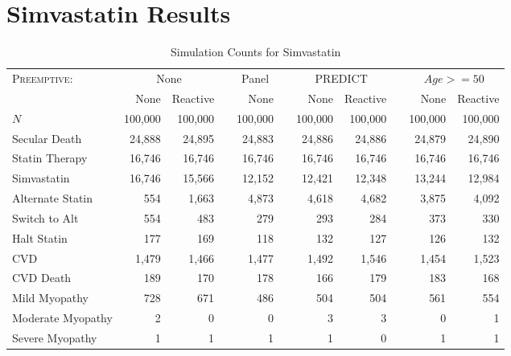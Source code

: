 \documentclass{article}
\begin{document}
\newcommand{\ra}[1]{\renewcommand{\arraystretch}{#1}}

\section{Simvastatin Results}



\begin{table*}\centering
\ra{1.1}
\begin{tabular}{@{}lrrrrrrrrrr@{}}\toprule
  \textsc{Preemptive:} &
  \multicolumn{2}{c}{None }      & \phantom{a} &
  \multicolumn{1}{c}{Panel}      & \phantom{a} &
  \multicolumn{2}{c}{PREDICT}    & \phantom{a} &
  \multicolumn{2}{c}{$Age >= 50$} \\

\cmidrule{2-3} \cmidrule{5-5} \cmidrule{7-8} \cmidrule{10-11}
& None & Reactive && None && None & Reactive && None & Reactive \\

\midrule

$N$ & 100,000 & 100,000 && 100,000 && 100,000 & 100,000 && 100,000 & 100,000 \\
Secular Death & 24,888 & 24,895 && 24,883 && 24,886 & 24,886 && 24,879 & 24,890 \\
Statin Therapy & 16,746 & 16,746 && 16,746 && 16,746 & 16,746 && 16,746 & 16,746 \\
Simvastatin & 16,746 & 15,566 && 12,152 && 12,421 & 12,348 && 13,244 & 12,984 \\
Alternate Statin & 554 & 1,663 && 4,873 && 4,618 & 4,682 && 3,875 & 4,092 \\
Switch to Alt & 554 & 483 && 279 && 293 & 284 && 373 & 330 \\
Halt Statin & 177 & 169 && 118 && 132 & 127 && 126 & 132 \\
CVD & 1,479 & 1,466 && 1,477 && 1,492 & 1,546 && 1,454 & 1,523 \\
CVD Death & 189 & 170 && 178 && 166 & 179 && 183 & 168 \\
Mild Myopathy & 728 & 671 && 486 && 504 & 504 && 561 & 554 \\
Moderate Myopathy & 2 & 0 && 0 && 3 & 3 && 0 & 1 \\
Severe Myopathy & 1 & 1 && 1 && 1 & 0 && 1 & 1 \\
\bottomrule
\end{tabular}
\caption{Simulation Counts for Simvastatin}
\end{table*}
\end{document}
